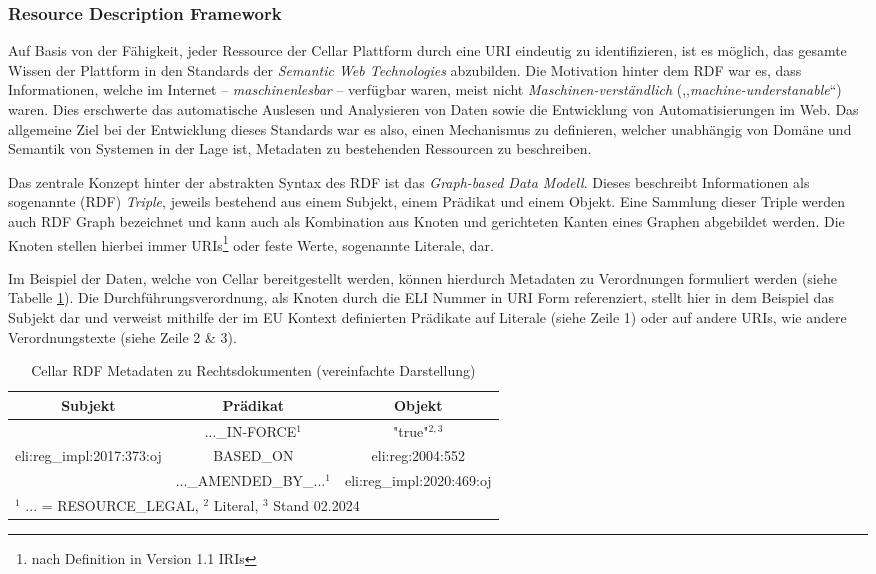 \subsubsection{Resource Description Framework}

Auf Basis von der Fähigkeit, jeder Ressource der Cellar Plattform durch eine \ac{URI} eindeutig zu identifizieren, ist es möglich, das gesamte Wissen der Plattform in den Standards der \textit{Semantic Web Technologies} abzubilden.
Die Motivation hinter dem \acf{RDF} war es, dass Informationen, welche im Internet -- \textit{maschinenlesbar} -- verfügbar waren, meist nicht \textit{Maschinen-verständlich} (,,\textit{machine-understanable}``) waren.
Dies erschwerte das automatische Auslesen und Analysieren von Daten sowie die Entwicklung von Automatisierungen im Web.
Das allgemeine Ziel bei der Entwicklung dieses Standards war es also, einen Mechanismus zu definieren, welcher unabhängig von Domäne und Semantik von Systemen in der Lage ist, Metadaten zu bestehenden Ressourcen zu beschreiben. \cite[Abs. 1]{eu_rdf_w3c} 

Das zentrale Konzept hinter der abstrakten Syntax des \ac{RDF} ist das \textit{Graph-based Data Modell}.
Dieses beschreibt Informationen als sogenannte (\ac{RDF}) \textit{Triple}, jeweils bestehend aus einem Subjekt, einem Prädikat und einem Objekt. 
Eine Sammlung dieser Triple werden auch \ac{RDF} Graph bezeichnet und kann auch als Kombination aus Knoten und gerichteten Kanten eines Graphen abgebildet werden.
Die Knoten stellen hierbei immer \acp{URI}\footnote{nach Definition in Version 1.1 \acp{IRI}} oder feste Werte, sogenannte Literale, dar.
\cite[Abs. 1.1]{eu_rdf_concepts}


Im Beispiel der Daten, welche von Cellar bereitgestellt werden, können hierdurch Metadaten zu Verordnungen formuliert werden (siehe Tabelle \ref{tab:rdf_example}).
Die Durchführungsverordnung, als Knoten durch die \ac{ELI} Nummer in \ac{URI} Form referenziert, stellt hier in dem Beispiel das Subjekt dar und verweist mithilfe der im EU Kontext definierten Prädikate auf Literale (siehe Zeile 1) oder auf andere \acp{URI}, wie andere Verordnungstexte (siehe Zeile 2 \& 3). 
\begin{table}[h]
    \centering
    \begin{tabular}{|c|c|c|} \hline
         Subjekt&  Prädikat& Objekt\\ \hline\hline
         &  ...\_IN-FORCE$^1$& "true"$^{2,3}$\\ \cline{2-3}
         eli:reg\_impl:2017:373:oj&  BASED\_ON& eli:reg:2004:552\\ \cline{2-3} 
         &  ...\_AMENDED\_BY\_...$^1$& eli:reg\_impl:2020:469:oj\\ \hline
 \multicolumn{3}{l}{\footnotesize $^1$ ... = RESOURCE\_LEGAL, $^2$ Literal, $^3$ Stand 02.2024}\\
    \end{tabular}
    \caption{Cellar RDF Metadaten zu Rechtsdokumenten (vereinfachte Darstellung)}
    \label{tab:rdf_example}
\end{table}

